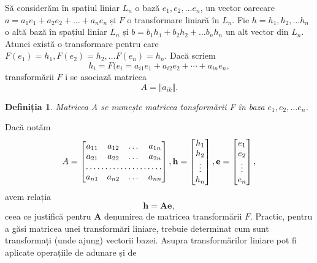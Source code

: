 Să considerăm în spațiul liniar $\mathit{L_{n}}$ o bază $e_{1}, e_{2}, \dots
e_{n}$, un vector oarecare $a = a_{1}e_{1} + a_{2}e_{2} + \dots + a_{n}e_{n}$
și $\mathit{F}$ o transformare liniară în $\mathit{L_{n}}$. Fie $h = h_{1},
h_{2}, \dots h_{n}$ o altă bază în spațiul liniar $\mathit{L_{n}}$ și 
$b = b_{1}h_{1} + b_{2}h_{2} + \dots b_{n}h_{n}$ un alt vector
din $\mathit{L_{n}}$.
Atunci există o transformare pentru care $F(e_{1}) =
h_{1}, F(e_{2}) = h_{2}, \dots F(e_{n}) = h_{n}$. Dacă scriem
\begin{equation}
h_{i} = F(e_{i} = a_{i1}e_{1} + a_{i2}e_{2} + \cdots + a_{in}e_{n},
\end{equation} transformării $F$ i se asociază matricea 
\begin{equation}
A = \Vert a_{ik} \Vert.
\end{equation}
\newtheorem{th_lt_matrix}[theorem_liniar_space]{Definiția}
\begin{th_lt_matrix} 
Matricea A se numește
matricea tansformării F în baza $e_{1}, e_{2}, \dots e_{n}$.
\end{th_lt_matrix}
Dacă notăm 
\begin{equation*}
A =
\begin{bmatrix}
a_{11} & a_{12} & \dots & a_{1n} \\
a_{21} & a_{22} & \dots & a_{2n} \\
\hdotsfor{4} \\
a_{n1} & a_{n2} & \dots & a_{nn}
\end{bmatrix} ,
\mathbf{h} =
\begin{bmatrix}
h_{1} \\
h_{2} \\
\vdots \\
h_{n}
\end{bmatrix} ,
\mathbf{e} =
\begin{bmatrix}
e_{1} \\
e_{2} \\
\vdots \\
e_{n}
\end{bmatrix}, 
\end{equation*} avem relația
\begin{equation}
\mathbf{h} = \mathbf{Ae},
\end{equation} ceea ce justifică pentru $\mathbf{A}$ denumirea de matricea
transformării $\mathit{F}$.
Practic, pentru a găsi matricea unei transformări liniare, trebuie determinat
cum sunt transformați (unde ajung) vectorii bazei.
Asupra transformărilor liniare pot fi aplicate operațiile de adunare și de

